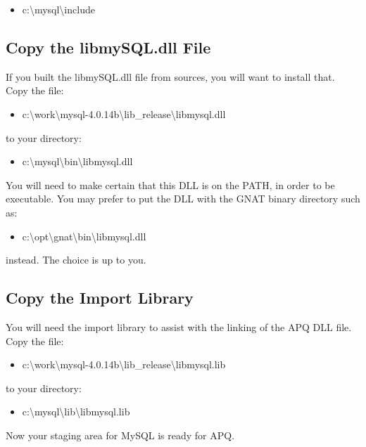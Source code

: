 \documentclass[english]{report}
\begin{document}
\begin{itemize}
\item c:\textbackslash{}mysql\textbackslash{}include
\end{itemize}

\subsection{Copy the libmySQL.dll File}

If you built the libmySQL.dll file from sources, you will want to
install that. Copy the file:

\begin{itemize}
\item c:\textbackslash{}work\textbackslash{}mysql-4.0.14b\textbackslash{}lib\_release\textbackslash{}libmysql.dll
\end{itemize}
to your directory:

\begin{itemize}
\item c:\textbackslash{}mysql\textbackslash{}bin\textbackslash{}libmysql.dll
\end{itemize}
You will need to make certain that this DLL is on the PATH, in order
to be executable. You may prefer to put the DLL with the GNAT binary
directory such as:

\begin{itemize}
\item c:\textbackslash{}opt\textbackslash{}gnat\textbackslash{}bin\textbackslash{}libmysql.dll
\end{itemize}
instead. The choice is up to you.


\subsection{Copy the Import Library}

You will need the import library to assist with the linking of the
APQ DLL file. Copy the file:

\begin{itemize}
\item c:\textbackslash{}work\textbackslash{}mysql-4.0.14b\textbackslash{}lib\_release\textbackslash{}libmysql.lib
\end{itemize}
to your directory:

\begin{itemize}
\item c:\textbackslash{}mysql\textbackslash{}lib\textbackslash{}libmysql.lib
\end{itemize}
Now your staging area for MySQL is ready for APQ.
\end{document}
